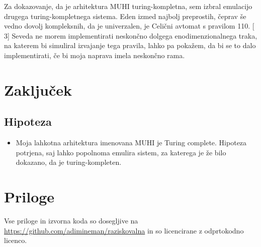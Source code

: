 \documentclass[12pt]{article}
\begin{document}
Za dokazovanje, da je arhitektura MUHI turing-kompletna, sem izbral emulacijo drugega turing-kompletnega sistema.
Eden izmed najbolj preprostih, čeprav še vedno dovolj kompleksnih, da je univerzalen, je Celični avtomat s pravilom 110. [$3$]
Seveda ne morem implementirati neskončno dolgega enodimenzionalnega traka, na katerem bi simuliral izvajanje tega pravila, lahko pa pokažem, da bi se to dalo implementirati, če bi moja naprava imela neskončno rama.

\section{Zaključek}
\subsection{Hipoteza}
\begin{itemize}
  \item Moja lahkotna arhitektura imenovana MUHI je Turing complete.
  Hipoteza potrjena, saj lahko popolnoma emulira sistem, za katerega je že bilo dokazano, da je turing-kompleten.
\end{itemize}

\pagebreak

\section{Priloge}

Vse priloge in izvorna koda so dosegljive na \url{https://github.com/adimineman/raziskovalna} in so licencirane z odprtokodno licenco.

\lstset{
  basicstyle=\tiny,
  breaklines=true,
  frame=single,
  stepnumber=5,
}









%


\end{document}
